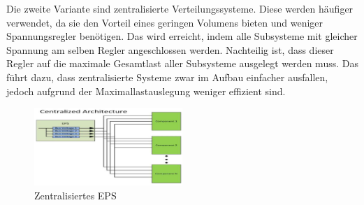  Die zweite Variante sind zentralisierte Verteilungssysteme. Diese werden häufiger verwendet, da sie den Vorteil eines geringen Volumens bieten und weniger Spannungsregler benötigen. Das wird erreicht, indem alle Subsysteme mit gleicher Spannung am selben Regler angeschlossen werden. Nachteilig ist, dass dieser Regler auf die maximale Gesamtlast aller Subsysteme ausgelegt werden muss. Das führt dazu, dass zentralisierte Systeme zwar im Aufbau einfacher ausfallen, jedoch aufgrund der Maximallastauslegung weniger effizient sind.\cite{Abaker.2017}
\begin{figure}[!h]
	\centering
		\includegraphics[width=0.50\textwidth]{./graphics/Centralized_EPS.PNG}
	\caption{Zentralisiertes EPS \cite{Abaker.2017}}
\end{figure}


\newpage

